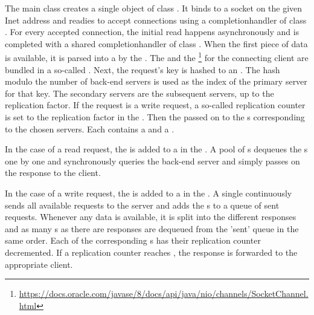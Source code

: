 \documentclass[11pt]{article}
\begin{document}
The main class  creates a single object of class .
It binds to a socket on the given Inet address and readies to accept connections using a completionhandler of class .
For every accepted connection, the initial read happens asynchronously and is completed with a shared completionhandler of class .
When the first piece of data is available, it is parsed into a  by the .
The  and the \footnote{\tiny\url{https://docs.oracle.com/javase/8/docs/api/java/nio/channels/SocketChannel.html}} for the connecting client are bundled in a so-called .
Next, the request's key is hashed to an .
The hash modulo the number of back-end servers is used as the index of the primary server for that key.
The secondary servers are the subsequent servers, up to the replication factor.
If the request is a write request, a so-called replication counter is set to the replication factor in the .
Then the  passed on to the s corresponding to the chosen servers.
Each  contains a  and a .

In the case of a read request, the  is added to a  in the .
A pool of s dequeues the s one by one and synchronously queries the back-end server and simply passes on the response to the client.

In the case of a write request, the  is added to a  in the .
A single  continuously sends all available requests to the server and adds the s to a queue of sent requests.
Whenever any data is available, it is split into the different responses and as many s as there are responses are dequeued from the 'sent' queue in the same order.
Each of the corresponding s has their replication counter decremented.
If a replication counter reaches , the response is forwarded to the appropriate client.
\end{document}
